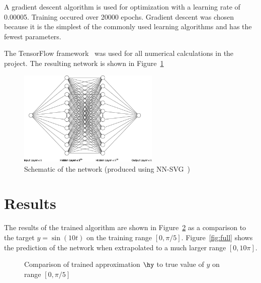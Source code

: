 \documentclass{article}
\def\datadir{2019-04-08-23-08-16}
\begin{document}
        A gradient descent algorithm is used for optimization with a learning rate of 0.00005. Training occured over 20000 epochs. Gradient descent was chosen because it is the simplest of the commonly used learning algorithms and has the fewest parameters.

        The TensorFlow framework~\cite{tf} was used for all numerical calculations in the project. The resulting network is shown in Figure~\ref{fig:network}

        \begin{figure}[!htbp]
            \centering
            \caption{Schematic of the network (produced using NN-SVG~\cite{schematic})} \label{fig:network}
            \includegraphics[width=0.6\textwidth]{nn.png}
        \end{figure}
    \section{Results}
        The results of the trained algorithm are shown in Figure~\ref{fig:output} as a comparison to the target $y=\sin(10t)$ on the training range $[0,\pi/5]$. Figure~\ref{fig:full} shows the prediction of the network when extrapolated to a much larger range $[0,10\pi]$.

        \begin{figure}[!htbp]
            \centering
            \caption{Comparison of trained approximation $\hy$ to true value of $y$ on range $[0,\pi/5]$} \label{fig:output}
        \end{figure}
\end{document}
